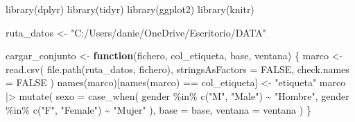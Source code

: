 \documentclass[
  spanish,
  a4paper,
  12pt,
  twoside]{memoir}
\newenvironment{Shaded}{\begin{snugshade}}{\end{snugshade}}
\newcommand{\AttributeTok}[1]{\textcolor[rgb]{0.40,0.45,0.13}{#1}}
\newcommand{\ConstantTok}[1]{\textcolor[rgb]{0.56,0.35,0.01}{#1}}
\newcommand{\ControlFlowTok}[1]{\textcolor[rgb]{0.00,0.23,0.31}{\textbf{#1}}}
\newcommand{\FunctionTok}[1]{\textcolor[rgb]{0.28,0.35,0.67}{#1}}
\newcommand{\NormalTok}[1]{\textcolor[rgb]{0.00,0.23,0.31}{#1}}
\newcommand{\OtherTok}[1]{\textcolor[rgb]{0.00,0.23,0.31}{#1}}
\newcommand{\SpecialCharTok}[1]{\textcolor[rgb]{0.37,0.37,0.37}{#1}}
\newcommand{\StringTok}[1]{\textcolor[rgb]{0.13,0.47,0.30}{#1}}
\begin{document}
\begin{Shaded}
\begin{Highlighting}[]
\FunctionTok{library}\NormalTok{(dplyr)}
\FunctionTok{library}\NormalTok{(tidyr)}
\FunctionTok{library}\NormalTok{(ggplot2)}
\FunctionTok{library}\NormalTok{(knitr)}

\NormalTok{ruta\_datos }\OtherTok{\textless{}{-}} \StringTok{"C:/Users/danie/OneDrive/Escritorio/DATA"}

\NormalTok{cargar\_conjunto }\OtherTok{\textless{}{-}} \ControlFlowTok{function}\NormalTok{(fichero, col\_etiqueta,}
\NormalTok{                            base, ventana) \{}
\NormalTok{  marco }\OtherTok{\textless{}{-}} \FunctionTok{read.csv}\NormalTok{(}
    \FunctionTok{file.path}\NormalTok{(ruta\_datos, fichero),}
    \AttributeTok{stringsAsFactors =} \ConstantTok{FALSE}\NormalTok{, }\AttributeTok{check.names =} \ConstantTok{FALSE}
\NormalTok{  )}
  \FunctionTok{names}\NormalTok{(marco)[}\FunctionTok{names}\NormalTok{(marco) }\SpecialCharTok{==}\NormalTok{ col\_etiqueta] }\OtherTok{\textless{}{-}} \StringTok{"etiqueta"}
\NormalTok{  marco }\SpecialCharTok{|\textgreater{}}
    \FunctionTok{mutate}\NormalTok{(}
      \AttributeTok{sexo =} \FunctionTok{case\_when}\NormalTok{(}
\NormalTok{        gender }\SpecialCharTok{\%in\%} \FunctionTok{c}\NormalTok{(}\StringTok{"M"}\NormalTok{, }\StringTok{"Male"}\NormalTok{)   }\SpecialCharTok{\textasciitilde{}} \StringTok{"Hombre"}\NormalTok{,}
\NormalTok{        gender }\SpecialCharTok{\%in\%} \FunctionTok{c}\NormalTok{(}\StringTok{"F"}\NormalTok{, }\StringTok{"Female"}\NormalTok{) }\SpecialCharTok{\textasciitilde{}} \StringTok{"Mujer"}
\NormalTok{      ),}
      \AttributeTok{base =}\NormalTok{ base,}
      \AttributeTok{ventana =}\NormalTok{ ventana}
\NormalTok{    )}
\NormalTok{\}}


\end{Highlighting}
\end{Shaded}
\end{document}
